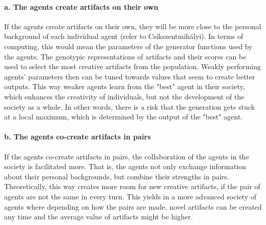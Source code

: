 \documentclass[english]{tktltiki}
\begin{document}
    \paragraph{a. The agents create artifacts on their own} If the agents create artifacts on their own, they will be more close to the personal background of each individual agent (refer to Cs\'ikszentmih\'alyi). In terms of computing, this would mean the parameters of the generator functions used by the agents. The genotypic representations of artifacts and their scores can be used to select the most creative artifacts from the population. Weakly performing agents' parameters then can be tuned towards values that seem to create better outputs. This way weaker agents learn from the "best" agent in their society, which enhances the creativity of individuals, but not the development of the society as a whole. In other words, there is a risk that the generation gets stuck at a local maximum, which is determined by the output of the "best" agent.

    \paragraph{b. The agents co-create artifacts in pairs} If the agents co-create artifacts in pairs, the collaboration of the agents in the society is facilitated more. That is, the agents not only exchange information about their personal backgrounds, but combine their strengths in pairs. Theoretically, this way creates more room for new creative artifacts, if the pair of agents are not the same in every turn. This yields in a more advanced society of agents where depending on how the pairs are made, novel artifacts can be created any time and the average value of artifacts might be higher. 
    
    
\end{document}
